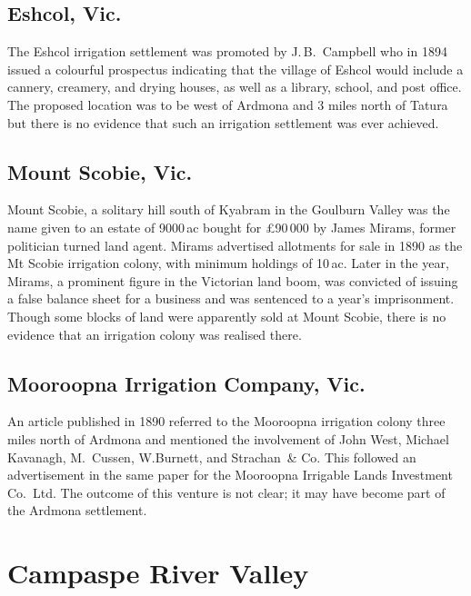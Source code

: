 \subsection*{Eshcol, Vic.}

The Eshcol irrigation settlement was promoted by J.\,B.~Campbell who
in 1894 issued a colourful prospectus indicating that the village of
Eshcol would include a cannery, creamery, and drying houses, as well
as a library, school, and post office.  The proposed location was to
be west of Ardmona and 3 miles north of Tatura but there is no
evidence that such an irrigation settlement was ever
achieved.

\subsection*{Mount Scobie, Vic.}

Mount Scobie, a solitary hill south of Kyabram in the Goulburn Valley
was the name given to an estate of 9000\,ac bought for \pounds90\,000
by James Mirams, former politician turned land agent.  Mirams advertised allotments
for sale in 1890 as the Mt Scobie irrigation colony, with minimum
holdings of 10\,ac.  Later in the
year, Mirams, a prominent figure in the Victorian land boom, was
convicted of issuing a false balance sheet for a business and was
sentenced to a year's imprisonment.  Though some blocks of land were apparently sold at
Mount Scobie, there is no evidence that an irrigation colony was
realised there.

\subsection*{Mooroopna Irrigation Company, Vic.}

An article published in 1890 referred to the Mooroopna irrigation
colony three miles north of Ardmona and mentioned the involvement of
John West, Michael Kavanagh, M.~Cussen, W.Burnett, and Strachan~\&
Co.  This followed an
advertisement in the same paper for the Mooroopna Irrigable Lands
Investment Co.\ Ltd.  The outcome of
this venture is not clear; it may have become part of the Ardmona
settlement.

\section*{Campaspe River Valley}

